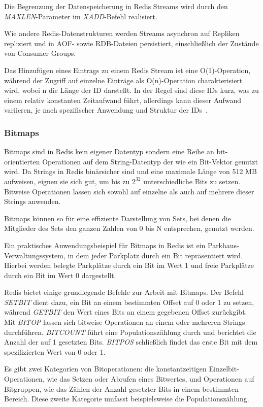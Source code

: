 Die Begrenzung der Datenspeicherung in Redis Streams wird durch den \emph{MAXLEN}-Parameter im \emph{XADD}-Befehl realisiert.

Wie andere Redis-Datenstrukturen werden Streams asynchron auf Repliken repliziert und in AOF- sowie RDB-Dateien persistiert, einschließlich der Zustände von Consumer Groups.

Das Hinzufügen eines Eintrags zu einem Redis Stream ist eine O(1)-Operation, während der Zugriff auf einzelne Einträge als O(n)-Operation charakterisiert wird, wobei n die Länge der ID darstellt. In der Regel sind diese IDs kurz, was zu einem relativ konstanten Zeitaufwand führt, allerdings kann dieser Aufwand variieren, je nach spezifischer Anwendung und Struktur der IDs~\cite{redis_ltd_streams_nodate}.

\subsubsection{Bitmaps}
Bitmaps sind in Redis kein eigener Datentyp sondern eine Reihe an bit-orientierten Operationen auf dem String-Datentyp der wie ein Bit-Vektor genutzt wird. Da Strings in Redis binärsicher sind und eine maximale Länge von 512 MB aufweisen, eignen sie sich gut, um bis zu \(2^{32}\) unterschiedliche Bits zu setzen.
Bitweise Operationen lassen sich sowohl auf einzelne als auch auf mehrere dieser Strings anwenden.

Bitmaps können so für eine effiziente Darstellung von Sets, bei denen die Mitglieder des Sets den ganzen Zahlen von 0 bis N entsprechen, genutzt werden.

Ein praktisches Anwendungsbeispiel für Bitmaps in Redis ist ein Parkhaus-Verwaltungssystem, in dem jeder Parkplatz durch ein Bit repräsentiert wird. Hierbei werden belegte Parkplätze durch ein Bit im Wert 1 und freie Parkplätze durch ein Bit im Wert 0 dargestellt.

Redis bietet einige grundlegende Befehle zur Arbeit mit Bitmaps. Der Befehl \emph{SETBIT} dient dazu, ein Bit an einem bestimmten Offset auf 0 oder 1 zu setzen, während \emph{GETBIT} den Wert eines Bits an einem gegebenen Offset zurückgibt. Mit \emph{BITOP} lassen sich bitweise Operationen an einem oder mehreren Strings durchführen. \emph{BITCOUNT} führt eine Populationszählung durch und berichtet die Anzahl der auf 1 gesetzten Bits. \emph{BITPOS} schließlich findet das erste Bit mit dem spezifizierten Wert von 0 oder 1.

Es gibt zwei Kategorien von Bitoperationen: die konstantzeitigen Einzelbit-Operationen, wie das Setzen oder Abrufen eines Bitwertes, und Operationen auf Bitgruppen, wie das Zählen der Anzahl gesetzter Bits in einem bestimmten Bereich. Diese zweite Kategorie umfasst beispielsweise die Populationszählung.

